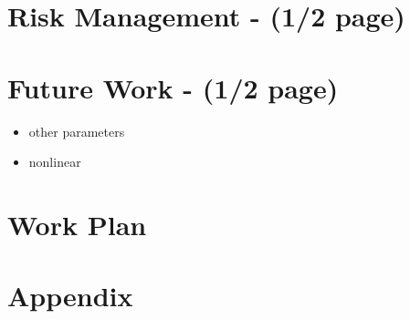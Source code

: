 \documentclass[11pt]{article}
\begin{document}
\section{Risk Management - (1/2 page)}

\section{Future Work - (1/2 page)}
\begin{itemize}
    \item other parameters
    \item nonlinear
\end{itemize}

\section{Work Plan}



\section*{Appendix}
\end{document}
